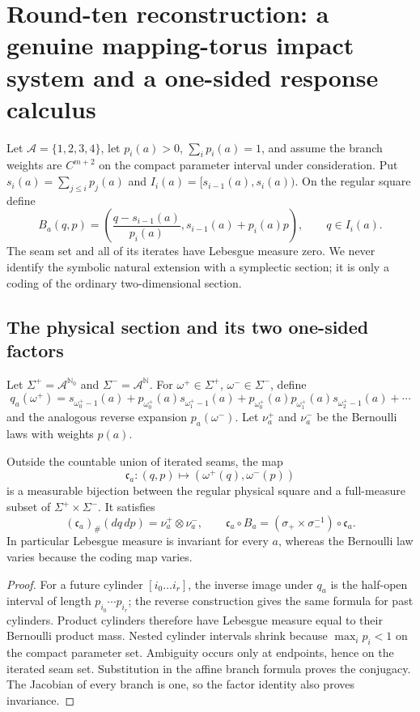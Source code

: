 \section{Round-ten reconstruction: a genuine mapping-torus impact system and a one-sided response calculus}
\label{sec:r10-a1}

Let \(\mathcal A=\{1,2,3,4\}\), let
\(p_i(a)>0\), \(\sum_i p_i(a)=1\), and assume the branch weights are
\(C^{m+2}\) on the compact parameter interval under consideration.  Put
\(s_i(a)=\sum_{j\le i}p_j(a)\) and
\(I_i(a)=[s_{i-1}(a),s_i(a))\).  On the regular square define
\[
 B_a(q,p)=\left(
 \frac{q-s_{i-1}(a)}{p_i(a)},
 s_{i-1}(a)+p_i(a)p
 \right),\qquad q\in I_i(a).
\]
The seam set and all of its iterates have Lebesgue measure zero.  We never
identify the symbolic natural extension with a symplectic section; it is only
a coding of the ordinary two-dimensional section.

\subsection{The physical section and its two one-sided factors}

Let \(\Sigma^+=\mathcal A^{\mathbb N_0}\) and
\(\Sigma^-=\mathcal A^{\mathbb N}\).  For
\(\omega^+\in\Sigma^+\), \(\omega^-\in\Sigma^-\), define
\[
 q_a(\omega^+)=s_{\omega^+_0-1}(a)
 +p_{\omega^+_0}(a)s_{\omega^+_1-1}(a)
 +p_{\omega^+_0}(a)p_{\omega^+_1}(a)s_{\omega^+_2-1}(a)+\cdots
\]
and the analogous reverse expansion \(p_a(\omega^-)\).  Let
\(\nu_a^+\) and \(\nu_a^-\) be the Bernoulli laws with weights \(p(a)\).

\begin{theorem}
\label{thm:r10-a1-factor}
Outside the countable union of iterated seams, the map
\[
 \mathfrak c_a:(q,p)\longmapsto(\omega^+(q),\omega^-(p))
\]
is a measurable bijection between the regular physical square and a
full-measure subset of \(\Sigma^+\times\Sigma^-\).  It satisfies
\[
 (\mathfrak c_a)_\#(dq\,dp)=\nu_a^+\otimes\nu_a^-,
 \qquad
 \mathfrak c_a\circ B_a=(\sigma_+\times\sigma_-^{-1})\circ\mathfrak c_a.
\]
In particular Lebesgue measure is invariant for every \(a\), whereas the
Bernoulli law varies because the coding map varies.
\end{theorem}

\begin{proof}
For a future cylinder \([i_0\ldots i_r]\), the inverse image under
\(q_a\) is the half-open interval of length
\(p_{i_0}\cdots p_{i_r}\); the reverse construction gives the same formula
for past cylinders.  Product cylinders therefore have Lebesgue measure equal
to their Bernoulli product mass.  Nested cylinder intervals shrink because
\(\max_i p_i<1\) on the compact parameter set.  Ambiguity occurs only at
endpoints, hence on the iterated seam set.  Substitution in the affine branch
formula proves the conjugacy.  The Jacobian of every branch is one, so the
factor identity also proves invariance.
\end{proof}


